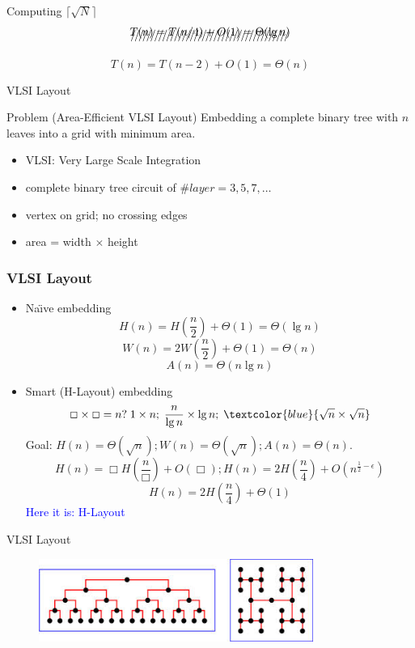 \documentclass{beamer}
\begin{document}
\begin{frame}{Computing $\lceil \sqrt{N} \rceil$}
  \[ \xout{T(n) = T(n/4) + O(1) = \Theta(\lg n)} \]

  \[ T(n) = T(n - 2) + O(1) = \Theta(n) \]
\end{frame}
\begin{frame}{VLSI Layout}
  \begin{exampleblock}{Problem (Area-Efficient VLSI Layout)}
    Embedding a complete binary tree with $n$ leaves into a grid with minimum
    area.
    \begin{itemize}
      \item VLSI: Very Large Scale Integration
      \item complete binary tree circuit of $\#layer = 3,5,7,\ldots$
      \item vertex on grid; no crossing edges
      \item area = width $\times$ height
    \end{itemize}
  \end{exampleblock}
\end{frame}
\begin{frame}
  \frametitle{VLSI Layout}

  \begin{itemize}
    \setlength{\itemsep}{0.50cm}
    \item Na\"{\i}ve embedding
     \[ H(n) = H(\frac{n}{2}) + \Theta(1) = \Theta(\lg n) \]
     \[ W(n) = 2W(\frac{n}{2}) + \Theta(1) = \Theta(n) \]
     \[ A(n) = \Theta(n \lg n) \]
    \item Smart (H-Layout) embedding
    \[ \Box \times \Box = n? \; 1 \times n;\; \frac{n}{\lg n} \times \lg n;\;
    \textcolor{blue}{\sqrt{n} \times \sqrt{n}}
    \]
    Goal: $H(n) = \Theta(\sqrt{n}); W(n) = \Theta(\sqrt{n}); A(n) = \Theta(n).$
    \[
      H(n) = \Box H(\frac{n}{\Box}) + O(\Box); H(n) = 2 H(\frac{n}{4}) +
      O(n^{\frac{1}{2} - \epsilon})
    \]
    \[ H(n) = 2H(\frac{n}{4}) + \Theta(1) \]
    \centering \textcolor{blue}{Here it is: H-Layout}
  \end{itemize}
\end{frame}
\begin{frame}{VLSI Layout}
  \begin{figure}[htp]
	\begin{center}
	  \includegraphics[width = 0.80\textwidth]{figure/vlsi}
	\end{center}
  \end{figure}
\end{frame}
\end{document}
